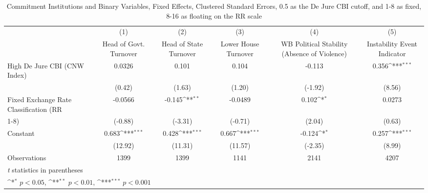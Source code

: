 \begin{table}[htbp]\centering
\def\sym#1{\ifmmode^{#1}\else\(^{#1}\)\fi}
\caption{Commitment Institutions and Binary Variables, Fixed Effects, Clustered Standard Errors, 0.5 as the De Jure CBI cutoff, and 1-8 as fixed, 8-16 as floating on the RR scale \label{binaryIndFEDJ}}
\begin{tabular}{l*{5}{c}}
\toprule
                                        &\multicolumn{1}{c}{(1)}&\multicolumn{1}{c}{(2)}&\multicolumn{1}{c}{(3)}&\multicolumn{1}{c}{(4)}&\multicolumn{1}{c}{(5)}\\
                                        &\multicolumn{1}{c}{Head of Govt. Turnover}&\multicolumn{1}{c}{Head of State Turnover}&\multicolumn{1}{c}{Lower House Turnover}&\multicolumn{1}{c}{WB Political Stability (Absence of Violence)}&\multicolumn{1}{c}{Instability Event Indicator}\\
\midrule
High De Jure CBI (CNW Index)            &   0.0326         &    0.101         &    0.104         &   -0.113         &    0.356\sym{***}\\
                                        &   (0.42)         &   (1.63)         &   (1.20)         &  (-1.92)         &   (8.56)         \\
\addlinespace
Fixed Exchange Rate Classification (RR  &  -0.0566         &   -0.145\sym{**} &  -0.0489         &    0.102\sym{*}  &   0.0273         \\
1-8)                                    &  (-0.88)         &  (-3.31)         &  (-0.71)         &   (2.04)         &   (0.63)         \\
\addlinespace
Constant                                &    0.683\sym{***}&    0.428\sym{***}&    0.667\sym{***}&   -0.124\sym{*}  &    0.257\sym{***}\\
                                        &  (12.92)         &  (11.31)         &  (11.57)         &  (-2.35)         &   (8.99)         \\
\midrule
Observations                            &     1399         &     1399         &     1141         &     2141         &     4207         \\
\bottomrule
\multicolumn{6}{l}{\footnotesize \textit{t} statistics in parentheses}\\
\multicolumn{6}{l}{\footnotesize \sym{*} \(p<0.05\), \sym{**} \(p<0.01\), \sym{***} \(p<0.001\)}\\
\end{tabular}
\end{table}
